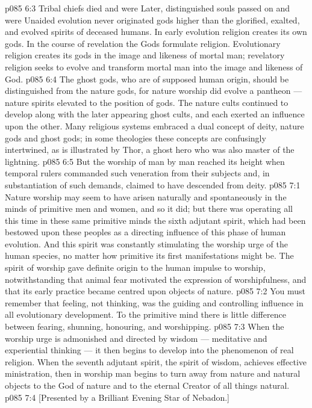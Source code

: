 \vs p085 6:3 Tribal chiefs died and were  Later, distinguished souls passed on and were  Unaided evolution never originated gods higher than the glorified, exalted, and evolved spirits of deceased humans. In early evolution religion creates its own gods. In the course of revelation the Gods formulate religion. Evolutionary religion creates its gods in the image and likeness of mortal man; revelatory religion seeks to evolve and transform mortal man into the image and likeness of God.
\vs p085 6:4 The ghost gods, who are of supposed human origin, should be distinguished from the nature gods, for nature worship did evolve a pantheon --- nature spirits elevated to the position of gods. The nature cults continued to develop along with the later appearing ghost cults, and each exerted an influence upon the other. Many religious systems embraced a dual concept of deity, nature gods and ghost gods; in some theologies these concepts are confusingly intertwined, as is illustrated by Thor, a ghost hero who was also master of the lightning.
\vs p085 6:5 But the worship of man by man reached its height when temporal rulers commanded such veneration from their subjects and, in substantiation of such demands, claimed to have descended from deity.
\vs p085 7:1 Nature worship may seem to have arisen naturally and spontaneously in the minds of primitive men and women, and so it did; but there was operating all this time in these same primitive minds the sixth adjutant spirit, which had been bestowed upon these peoples as a directing influence of this phase of human evolution. And this spirit was constantly stimulating the worship urge of the human species, no matter how primitive its first manifestations might be. The spirit of worship gave definite origin to the human impulse to worship, notwithstanding that animal fear motivated the expression of worshipfulness, and that its early practice became centred upon objects of nature.
\vs p085 7:2 You must remember that feeling, not thinking, was the guiding and controlling influence in all evolutionary development. To the primitive mind there is little difference between fearing, shunning, honouring, and worshipping.
\vs p085 7:3 When the worship urge is admonished and directed by wisdom --- meditative and experiential thinking --- it then begins to develop into the phenomenon of real religion. When the seventh adjutant spirit, the spirit of wisdom, achieves effective ministration, then in worship man begins to turn away from nature and natural objects to the God of nature and to the eternal Creator of all things natural.
\vsetoff
\vs p085 7:4 [Presented by a Brilliant Evening Star of Nebadon.]
\quizlink
